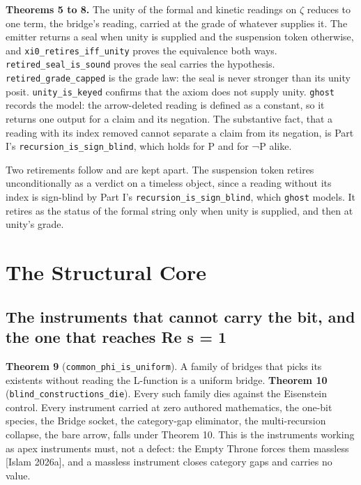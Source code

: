 \documentclass[10pt,twocolumn]{article}
\begin{document}
\textbf{Theorems 5 to 8.} The unity of the formal and kinetic readings
on \(\zeta\) reduces to one term, the bridge's reading, carried at the
grade of whatever supplies it. The emitter returns a seal when unity is
supplied and the suspension token otherwise, and
\texttt{xi0\_retires\_iff\_unity} proves the equivalence both ways.
\texttt{retired\_seal\_is\_sound} proves the seal carries the
hypothesis. \texttt{retired\_grade\_capped} is the grade law: the seal
is never stronger than its unity posit. \texttt{unity\_is\_keyed}
confirms that the axiom does not supply unity. \texttt{ghost} records
the model: the arrow-deleted reading is defined as a constant, so it
returns one output for a claim and its negation. The substantive fact,
that a reading with its index removed cannot separate a claim from its
negation, is Part I's \texttt{recursion\_is\_sign\_blind}, which holds
for P and for ¬P alike.

Two retirements follow and are kept apart. The suspension token retires
unconditionally as a verdict on a timeless object, since a reading
without its index is sign-blind by Part I's
\texttt{recursion\_is\_sign\_blind}, which \texttt{ghost} models. It
retires as the status of the formal string only when unity is supplied,
and then at unity's grade.

\hypertarget{the-structural-core}{%
\section{The Structural Core}\label{the-structural-core}}

\hypertarget{the-instruments-that-cannot-carry-the-bit-and-the-one-that-reaches-re-s-1}{%
\subsection{The instruments that cannot carry the bit, and the one that
reaches Re s =
1}\label{the-instruments-that-cannot-carry-the-bit-and-the-one-that-reaches-re-s-1}}

\textbf{Theorem 9} (\texttt{common\_phi\_is\_uniform}). A family of
bridges that picks its existents without reading the L-function is a
uniform bridge. \textbf{Theorem 10}
(\texttt{blind\_constructions\_die}). Every such family dies against the
Eisenstein control. Every instrument carried at zero authored
mathematics, the one-bit species, the Bridge socket, the category-gap
eliminator, the multi-recursion collapse, the bare arrow, falls under
Theorem 10. This is the instruments working as apex instruments must,
not a defect: the Empty Throne forces them massless {[}Islam 2026a{]},
and a massless instrument closes category gaps and carries no value.
\end{document}
